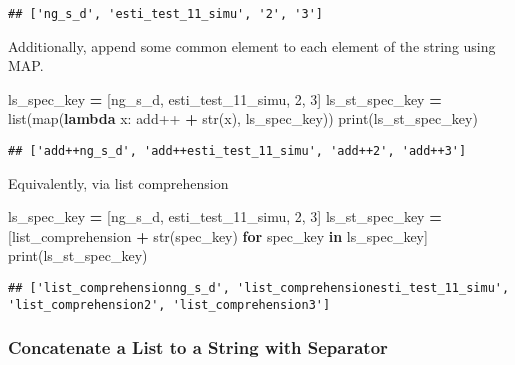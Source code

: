 \documentclass[
]{book}
\newenvironment{Shaded}{\begin{snugshade}}{\end{snugshade}}
\newcommand{\BuiltInTok}[1]{#1}
\newcommand{\ControlFlowTok}[1]{\textcolor[rgb]{0.13,0.29,0.53}{\textbf{#1}}}
\newcommand{\DecValTok}[1]{\textcolor[rgb]{0.00,0.00,0.81}{#1}}
\newcommand{\KeywordTok}[1]{\textcolor[rgb]{0.13,0.29,0.53}{\textbf{#1}}}
\newcommand{\NormalTok}[1]{#1}
\newcommand{\OperatorTok}[1]{\textcolor[rgb]{0.81,0.36,0.00}{\textbf{#1}}}
\newcommand{\StringTok}[1]{\textcolor[rgb]{0.31,0.60,0.02}{#1}}
\begin{document}
\begin{verbatim}
## ['ng_s_d', 'esti_test_11_simu', '2', '3']
\end{verbatim}

Additionally, append some common element to each element of the string using MAP.

\begin{Shaded}
\begin{Highlighting}[]
\NormalTok{ls\_spec\_key }\OperatorTok{=}\NormalTok{ [}\StringTok{\textquotesingle{}ng\_s\_d\textquotesingle{}}\NormalTok{, }\StringTok{\textquotesingle{}esti\_test\_11\_simu\textquotesingle{}}\NormalTok{, }\DecValTok{2}\NormalTok{, }\DecValTok{3}\NormalTok{]}
\NormalTok{ls\_st\_spec\_key }\OperatorTok{=} \BuiltInTok{list}\NormalTok{(}\BuiltInTok{map}\NormalTok{(}\KeywordTok{lambda}\NormalTok{ x: }\StringTok{\textquotesingle{}add++\textquotesingle{}} \OperatorTok{+} \BuiltInTok{str}\NormalTok{(x), ls\_spec\_key))}
\BuiltInTok{print}\NormalTok{(ls\_st\_spec\_key)}
\end{Highlighting}
\end{Shaded}

\begin{verbatim}
## ['add++ng_s_d', 'add++esti_test_11_simu', 'add++2', 'add++3']
\end{verbatim}

Equivalently, via list comprehension

\begin{Shaded}
\begin{Highlighting}[]
\NormalTok{ls\_spec\_key }\OperatorTok{=}\NormalTok{ [}\StringTok{\textquotesingle{}ng\_s\_d\textquotesingle{}}\NormalTok{, }\StringTok{\textquotesingle{}esti\_test\_11\_simu\textquotesingle{}}\NormalTok{, }\DecValTok{2}\NormalTok{, }\DecValTok{3}\NormalTok{]}
\NormalTok{ls\_st\_spec\_key }\OperatorTok{=}\NormalTok{ [}\StringTok{\textquotesingle{}list\_comprehension\textquotesingle{}} \OperatorTok{+} \BuiltInTok{str}\NormalTok{(spec\_key) }\ControlFlowTok{for}\NormalTok{ spec\_key }\KeywordTok{in}\NormalTok{ ls\_spec\_key]}
\BuiltInTok{print}\NormalTok{(ls\_st\_spec\_key)}
\end{Highlighting}
\end{Shaded}

\begin{verbatim}
## ['list_comprehensionng_s_d', 'list_comprehensionesti_test_11_simu', 'list_comprehension2', 'list_comprehension3']
\end{verbatim}

\hypertarget{concatenate-a-list-to-a-string-with-separator}{%
\subsubsection{Concatenate a List to a String with Separator}\label{concatenate-a-list-to-a-string-with-separator}}
\end{document}
